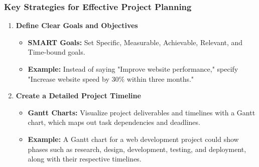\documentclass[aspectratio=169]{beamer}
\begin{document}
\begin{frame}[fragile]
    \frametitle{Key Strategies for Effective Project Planning}
    \begin{enumerate}
        \item \textbf{Define Clear Goals and Objectives}
        \begin{itemize}
            \item \textbf{SMART Goals:} Set Specific, Measurable, Achievable, Relevant, and Time-bound goals.
            \item \textbf{Example:} Instead of saying "Improve website performance," specify "Increase website speed by 30\% within three months."
        \end{itemize}
        
        \item \textbf{Create a Detailed Project Timeline}
        \begin{itemize}
            \item \textbf{Gantt Charts:} Visualize project deliverables and timelines with a Gantt chart, which maps out task dependencies and deadlines.
            \item \textbf{Example:} A Gantt chart for a web development project could show phases such as research, design, development, testing, and deployment, along with their respective timelines.
        \end{itemize}
    \end{enumerate}
\end{frame}
\end{document}
